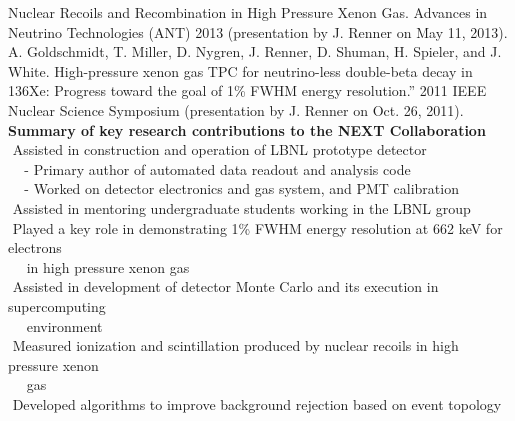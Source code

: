 \noindent Nuclear Recoils and Recombination in High Pressure Xenon Gas.  Advances in Neutrino Technologies (ANT) 2013 
(presentation by J. Renner on May 11, 2013).\\

\newpage
\noindent A. Goldschmidt, T. Miller, D. Nygren, J. Renner, D. Shuman, H. Spieler, and J. White.
High-pressure xenon gas TPC for neutrino-less double-beta decay in 136Xe: Progress toward the goal of 1\% FWHM energy resolution.” 
2011 IEEE Nuclear Science Symposium (presentation by J. Renner on Oct. 26, 2011).\\

{\noindent\textbf{Summary of key research contributions to the NEXT Collaboration}}\\

\indent\hspace{0.2 cm}\textbullet\,\,Assisted in construction and operation of LBNL prototype detector\\
\indent\hspace{0.2 cm}\,\,\,\,\,\,\,- Primary author of automated data readout and analysis code\\
\indent\hspace{0.2 cm}\,\,\,\,\,\,\,- Worked on detector electronics and gas system, and PMT calibration\\
\indent\hspace{0.2 cm}\textbullet\,\,Assisted in mentoring undergraduate students working in the LBNL group\\
\indent\hspace{0.2 cm}\textbullet\,\,Played a key role in demonstrating 1\% FWHM energy resolution at 662 keV for electrons\\
\indent\hspace{0.2 cm}\,\,\,\,\,\,\,\,in high pressure xenon gas\\
\indent\hspace{0.2 cm}\textbullet\,\,Assisted in development of detector Monte Carlo and its execution in supercomputing\\
\indent\hspace{0.2 cm}\,\,\,\,\,\,\,\,environment\\
\indent\hspace{0.2 cm}\textbullet\,\,Measured ionization and scintillation produced by nuclear recoils in high pressure xenon\\
\indent\hspace{0.2 cm}\,\,\,\,\,\,\,\,gas\\
\indent\hspace{0.2 cm}\textbullet\,\,Developed algorithms to improve background rejection based on event topology\\

